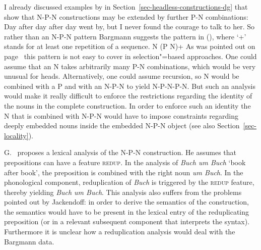 \begin{exe}
\begin{xlist}[iv.]
\begin{exe}
\begin{xlist}[iv.]
I already discussed examples by \citet{Bargmann2015a} in Section~\ref{sec-headless-constructions-dg}
that show that N-P-N constructions may be extended by further P-N combinations:
\ea
Day after day after day went by, but I never found the courage to talk to her.
\z
So rather than an N-P-N pattern Bargmann suggests the pattern in (), where `+'\is{$+$} stands for at
least one repetition of a sequence.
\ea
N (P N)+
\z
As was pointed out on page~\pageref{n-p-n-plus-cx} this pattern is not easy to cover in
selection"=based approaches. One could assume that an N takes arbitrarily many P-N combinations,
which would be very unusual for heads. Alternatively, one could assume recursion, so N would be
combined with a P and with an N-P-N to yield N-P-N-P-N. But such an analysis would make it
really difficult to enforce the restrictions regarding the identity of the nouns in the complete
construction. In order to enforce such an identity the N that is combined with N-P-N would have to
impose constraints regarding deeply embedded nouns inside the embedded N-P-N object (see also Section~\ref{sec-locality}).

G.\ \citet{GMueller2011a} proposes a lexical analysis of the N-P-N construction. He assumes that prepositions can have a feature \textsc{redup}.
In the analysis of \emph{Buch um Buch} `book after book', the preposition is combined with the right noun \emph{um Buch}. In the phonological component, reduplication of \emph{Buch} is triggered
  by the \textsc{redup} feature, thereby yielding \emph{Buch um Buch}.
This analysis also suffers from the problems pointed out by Jackendoff: in order to derive the semantics of the construction, the semantics would have to be present
in the lexical entry of the reduplicating preposition (or in a relevant subsequent component that
interprets the syntax).  Furthermore it is unclear how a reduplication analysis would deal with the
Bargmann data.





\end{xlist}
\end{exe}
\end{xlist}
\end{exe}
